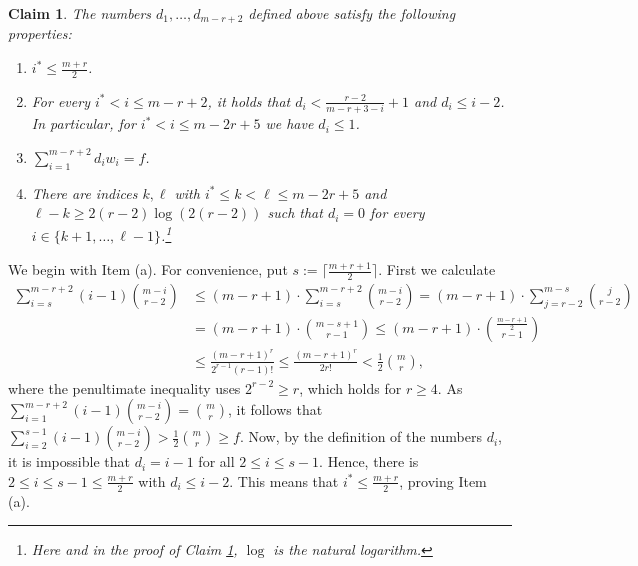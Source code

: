 \documentclass[11pt]{article}
\let\oldendproof\endproof
\renewenvironment{proof}[1][\proofname]{%
	\oldproof[\bf #1]%
}{\oldendproof}
\theoremstyle{plain}
\newtheorem{claim}[theorem]{Claim}
\begin{document}
\begin{proof}[Proof of Lemma \ref{r-graphs induction base case}]
    \begin{claim}\label{d_i}
    The numbers $d_1,\dots,d_{m-r+2}$ defined above satisfy the following properties:
    \begin{enumerate}
        \item[(a)] $i^* \leq \frac{m+r}{2}$.
        \item[(b)] For every $i^* < i \leq m-r+2$, it holds that $d_i < \frac{r-2}{m-r+3-i} + 1$ and $d_i \leq i-2$. In particular, for $i^* < i \leq m-2r+5$ we have $d_i \leq 1$.
        \item[(c)] $\sum_{i=1}^{m-r+2} d_i w_i = f$.
        \item[(d)] There are indices $k,\ell$ with $i^* \leq k < \ell \leq m-2r+5$ and $\ell-k \geq 2(r-2) \log(2(r-2))$ such that $d_i=0$ for every 
        $i \in \{k+1,\dots,\ell-1\}$.\footnote{Here and in the proof of Claim \ref{d_i}, $\log$ is the natural logarithm.}
    \end{enumerate}
    \end{claim}
    \begin{proof}
        We begin with Item (a). For convenience, put $s := \lceil \frac{m+r+1}{2} \rceil$.
        First we calculate
        \begin{align*}
            \sum_{i=s}^{m-r+2} (i-1) \binom{m-i}{r-2} &\leq (m-r+1) \cdot \sum_{i=s}^{m-r+2} \binom{m-i}{r-2} =
            (m-r+1) \cdot \sum_{j=r-2}^{m-s}\binom{j}{r-2} \\ &= (m-r+1) \cdot \binom{m-s+1}{r-1} 
            \leq (m-r+1) \cdot \binom{\frac{m-r+1}{2}}{r-1} \\ &\leq
            \frac{(m-r+1)^r}{2^{r-1} (r-1)!} \leq \frac{(m-r+1)^r}{2 r!} < \frac{1}{2}\binom{m}{r},
        \end{align*}
        where the penultimate inequality uses $2^{r-2} \geq r$, which holds for $r \geq 4$. 
        As $\sum_{i=1}^{m-r+2} (i-1) \binom{m-i}{r-2} = \binom{m}{r}$, it follows that 
        $\sum_{i=2}^{s-1} (i-1) \binom{m-i}{r-2} > \frac{1}{2}\binom{m}{r} \geq f$. Now, by the definition of the numbers $d_i$, it is impossible that $d_i = i-1$ for all $2 \leq i \leq s-1$. Hence, there is $2 \leq i \leq s-1 \leq \frac{m+r}{2}$ with $d_{i} \leq i-2$. This means that $i^* \leq \frac{m+r}{2}$, proving Item (a).


\end{proof}
\end{proof}
\end{document}
